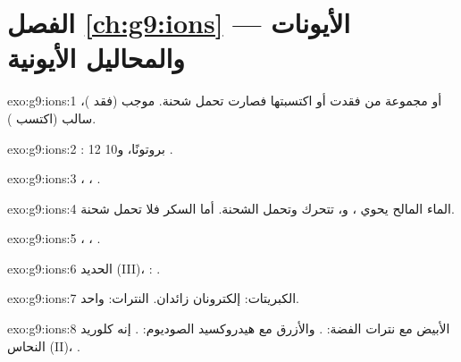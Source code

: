 \section*{الفصل \ref{ch:g9:ions} --- الأيونات والمحاليل الأيونية}

\begin{solution}{exo:g9:ions:1}
 أو مجموعة من  فقدت  أو اكتسبتها فصارت تحمل شحنة.
 موجب (فقد )،  سالب
(اكتسب ).
\end{solution}

\begin{solution}{exo:g9:ions:2}
: 12 بروتونًا، و10 .
\end{solution}

\begin{solution}{exo:g9:ions:3}
، ، .
\end{solution}

\begin{solution}{exo:g9:ions:4}
الماء المالح يحوي ،  و، تتحرك وتحمل
الشحنة. أما  السكر فلا تحمل شحنة.
\end{solution}

\begin{solution}{exo:g9:ions:5}
، ، .
\end{solution}

\begin{solution}{exo:g9:ions:6}
الحديد (III)، : .
\end{solution}

\begin{solution}{exo:g9:ions:7}
الكبريتات: إلكترونان زائدان. النترات:  واحد.
\end{solution}

\begin{solution}{exo:g9:ions:8}
الأبيض مع نترات الفضة: . والأزرق مع هيدروكسيد الصوديوم:
. إنه كلوريد النحاس (II)، .
\end{solution}


